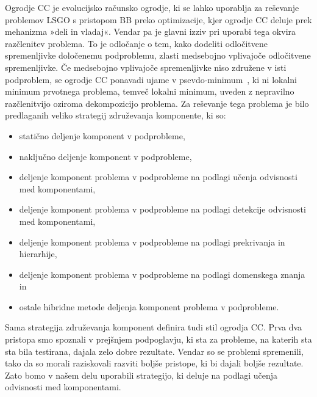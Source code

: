 Ogrodje CC je evolucijsko računsko ogrodje, ki se lahko uporablja za reševanje problemov LSGO s pristopom BB preko optimizacije, kjer ogrodje CC deluje prek mehanizma »deli in vladaj«.
Vendar pa je glavni izziv pri uporabi tega okvira razčlenitev problema.
To je odločanje o tem, kako dodeliti odločitvene spremenljivke določenemu podproblemu, zlasti medsebojno vplivajoče odločitvene spremenljivke.
Če medsebojno vplivajoče spremenljivke niso združene v isti podproblem, se ogrodje CC ponavadi ujame v psevdo-minimum~\cite{bib:psudo_min_cc}, ki ni lokalni minimum prvotnega problema, temveč lokalni minimum, uveden z nepravilno razčlenitvijo oziroma dekompozicijo problema.
Za reševanje tega problema je bilo predlaganih veliko strategij združevanja komponente, ki so:
\begin{itemize}
    \item statično deljenje komponent v podprobleme,
    \item naključno deljenje komponent v podprobleme,
    \item deljenje komponent problema v podprobleme na podlagi učenja odvisnosti med komponentami,
    \item deljenje komponent problema v podprobleme na podlagi detekcije odvisnosti med komponentami,
    \item deljenje komponent problema v podprobleme na podlagi prekrivanja in hierarhije,
    \item deljenje komponent problema v podprobleme na podlagi domenskega znanja in
    \item ostale hibridne metode deljenja komponent problema v podprobleme.
\end{itemize}
Sama strategija združevanja komponent definira tudi stil ogrodja CC.
Prva dva pristopa smo spoznali v prejšnjem podpoglavju, ki sta za probleme, na katerih sta sta bila testirana, dajala zelo dobre rezultate.
Vendar so se problemi spremenili, tako da so morali raziskovali razviti boljše pristope, ki bi dajali boljše rezultate.
Zato bomo v našem delu uporabili strategijo, ki deluje na podlagi učenja odvisnosti med komponentami.

